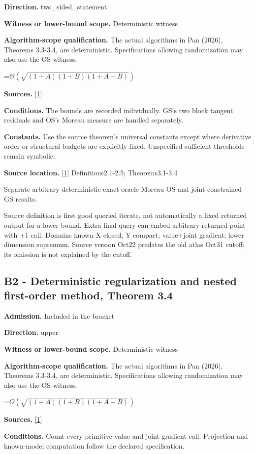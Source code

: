 \documentclass[10pt,a4paper]{article}
\newcommand{\AtlasMath}[1]{\par\begingroup\centering\setbox0=\hbox{$\displaystyle #1$}\ifdim\wd0>1.4\linewidth\typeout{ATLAS WIDE FORMULA: \the\wd0}\fi\ifdim\wd0>\linewidth\resizebox{\linewidth}{!}{\box0}\else\box0\fi\par\endgroup}
\begin{document}
\textbf{Direction.} two\_sided\_statement

\textbf{Witness or lower-bound scope.} Deterministic witness

\textbf{Algorithm-scope qualification.} The actual algorithms in Pan (2026), Theorems 3.3-3.4, are deterministic. Specifications allowing randomization may also use the OS witness.

\AtlasMath{\Theta\!\left(\sqrt{(1+A)(1+B)(1+A+B)}\right)}
\textbf{Sources.} \href{https://arxiv.org/pdf/2609.14235v2}{[1]}

\textbf{Conditions.} The bounds are recorded individually. GS's two block tangent residuals and OS's Moreau measure are handled separately.

\textbf{Constants.} Use the source theorem’s universal constants except where derivative order or structural budgets are explicitly fixed. Unspecified sufficient thresholds remain symbolic.

\textbf{Source location.} \href{https://arxiv.org/pdf/2609.14235v2}{[1]} Definitions2.1-2.5; Theorems3.1-3.4

Separate arbitrary deterministic exact-oracle Moreau OS and joint constrained GS results.

Source definition is first good queried iterate, not automatically a fixed returned output for a lower bound. Extra final query can embed arbitrary returned point with +1 call. Domains known X closed, Y compact; value+joint gradient; lower dimension supremum. Source version Oct22 predates the old atlas Oct31 cutoff; its omission is not explained by the cutoff.

\subsection{B2 - Deterministic regularization and nested first-order method, Theorem 3.4}
\textbf{Admission.} Included in the bracket

\textbf{Direction.} upper

\textbf{Witness or lower-bound scope.} Deterministic witness

\textbf{Algorithm-scope qualification.} The actual algorithms in Pan (2026), Theorems 3.3-3.4, are deterministic. Specifications allowing randomization may also use the OS witness.

\AtlasMath{O(\sqrt{(1+A)(1+B)(1+A+B)})}
\textbf{Sources.} \href{https://arxiv.org/pdf/2609.14235v2}{[1]}

\textbf{Conditions.} Count every primitive value and joint-gradient call. Projection and known-model computation follow the declared specification.
\end{document}
